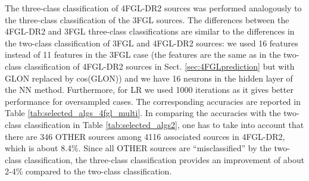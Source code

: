 \documentclass[referee]{aa} %
\begin{document}
\begin{table}[!h]
    \caption{
    Comparison of classes predicted for unassociated sources in the 3FGL catalog using three-class classification
    with associations in the 4FGL-DR2 catalog.}
    \label{tab:3FGL_vs_4FGL_3class}

\centering
{}
\end{table}



The three-class classification of 4FGL-DR2 sources was performed analogously to the three-class classification of the 3FGL sources.
The differences between the 4FGL-DR2 and 3FGL three-class classifications are similar to the differences in the two-class classification of 3FGL and 4FGL-DR2 sources:
we used 16 features instead of 11 features in the 3FGL case (the features are the same as in the two-class classification of 4FGL-DR2 sources in Sect. \ref{sec:4FGLprediction} but with GLON replaced by cos(GLON))
and we have 16 neurons in the hidden layer of the NN method. Furthermore, for LR we used 1000 iterations as it gives better performance for oversampled cases.
The corresponding accuracies are reported in Table \ref{tab:selected_algs_4fgl_multi}.
In comparing the accuracies with the two-class classification in Table \ref{tab:selected_algs2}, 
one has to take into account that there are 346 OTHER sources among 4116 associated sources in 4FGL-DR2, which is about 8.4\%.
Since all OTHER sources are ``misclassified'' by the two-class classification, the three-class classification provides an improvement of about 2-4\% compared to the two-class classification.
\end{document}
